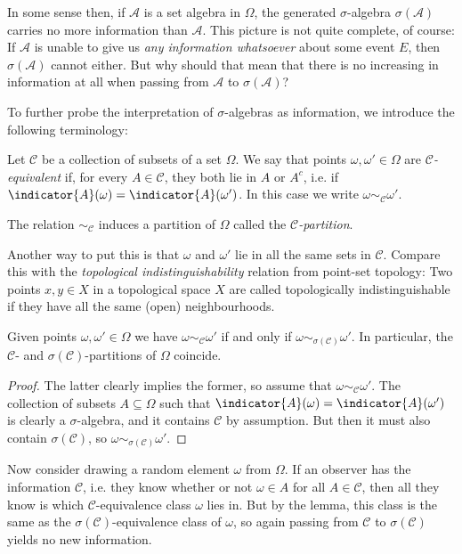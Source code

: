 \documentclass[article, a4paper, 11pt, oneside]{memoir}
\numberwithin{equation}{chapter}
\newcommand{\calA}{\mathcal{A}}
\newcommand{\calC}{\mathcal{C}}
\begin{document}
In some sense then, if $\calA$ is a set algebra in $\Omega$, the generated $\sigma$-algebra $\sigma(\calA)$ carries no more information than $\calA$. This picture is not quite complete, of course: If $\calA$ is unable to give us \emph{any information whatsoever} about some event $E$, then $\sigma(\calA)$ cannot either. But why should that mean that there is no increasing in information at all when passing from $\calA$ to $\sigma(\calA)$?

To further probe the interpretation of $\sigma$-algebras as information, we introduce the following terminology:

\begin{definition}
    Let $\calC$ be a collection of subsets of a set $\Omega$. We say that points $\omega, \omega' \in \Omega$ are \emph{$\calC$-equivalent} if, for every $A \in \calC$, they both lie in $A$ or $A^c$, i.e. if $\indicator{A}(\omega) = \indicator{A}(\omega')$. In this case we write $\omega \sim_\calC \omega'$.

    The relation $\sim_\calC$ induces a partition of $\Omega$ called the \emph{$\calC$-partition}.
\end{definition}
%
Another way to put this is that $\omega$ and $\omega'$ lie in all the same sets in $\calC$. Compare this with the \emph{topological indistinguishability} relation from point-set topology: Two points $x,y \in X$ in a topological space $X$ are called topologically indistinguishable if they have all the same (open) neighbourhoods.

\begin{lemma}
    Given points $\omega, \omega' \in \Omega$ we have $\omega \sim_\calC \omega'$ if and only if $\omega \sim_{\sigma(\calC)} \omega'$. In particular, the $\calC$- and $\sigma(\calC)$-partitions of $\Omega$ coincide.
\end{lemma}

\begin{proof}
    The latter clearly implies the former, so assume that $\omega \sim_\calC \omega'$. The collection of subsets $A \subseteq \Omega$ such that $\indicator{A}(\omega) = \indicator{A}(\omega')$ is clearly a $\sigma$-algebra, and it contains $\calC$ by assumption. But then it must also contain $\sigma(\calC)$, so $\omega \sim_{\sigma(\calC)} \omega'$.
\end{proof}
%
Now consider drawing a random element $\omega$ from $\Omega$. If an observer has the information $\calC$, i.e. they know whether or not $\omega \in A$ for all $A \in \calC$, then all they know is which $\calC$-equivalence class $\omega$ lies in. But by the lemma, this class is the same as the $\sigma(\calC)$-equivalence class of $\omega$, so again passing from $\calC$ to $\sigma(\calC)$ yields no new information.
\end{document}
